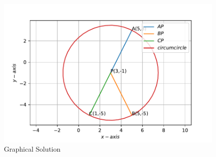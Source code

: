 \documentclass[journal,12pt,twocolumn]{IEEEtran}
\begin{document}
\begin{figure}
    \centering
    \includegraphics[width=\columnwidth]{equidistant point circumcircle.pdf}
    \caption{Graphical Solution}
    \label{fig:my_label}
\end{figure}\\
\end{document}
